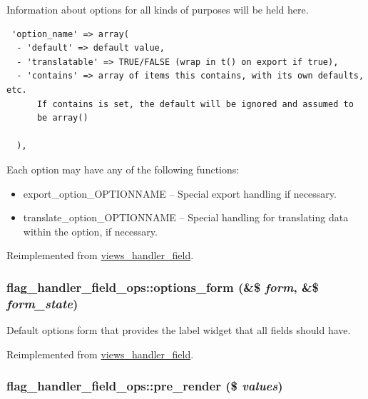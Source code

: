 Information about options for all kinds of purposes will be held here. 

\begin{Code}\begin{verbatim} 'option_name' => array(
  - 'default' => default value,
  - 'translatable' => TRUE/FALSE (wrap in t() on export if true),
  - 'contains' => array of items this contains, with its own defaults, etc.
      If contains is set, the default will be ignored and assumed to
      be array()

  ),
\end{verbatim}
\end{Code}

 Each option may have any of the following functions:\begin{itemize}
\item export\_\-option\_\-OPTIONNAME -- Special export handling if necessary.\item translate\_\-option\_\-OPTIONNAME -- Special handling for translating data within the option, if necessary. \end{itemize}


Reimplemented from \hyperlink{classviews__handler__field_64c69a8a3697603f8283405071c25b76}{views\_\-handler\_\-field}.\hypertarget{classflag__handler__field__ops_88b37806cdb2d420b830d0030ef7028a}{
\subsubsection[{options\_\-form}]{\setlength{\rightskip}{0pt plus 5cm}flag\_\-handler\_\-field\_\-ops::options\_\-form (\&\$ {\em form}, \/  \&\$ {\em form\_\-state})}}
\label{classflag__handler__field__ops_88b37806cdb2d420b830d0030ef7028a}


Default options form that provides the label widget that all fields should have. 

Reimplemented from \hyperlink{classviews__handler__field_0435d161922b7b4b84f02a2e79bb947a}{views\_\-handler\_\-field}.\hypertarget{classflag__handler__field__ops_5ad942714340d84d5462f3fd928a230c}{
\subsubsection[{pre\_\-render}]{\setlength{\rightskip}{0pt plus 5cm}flag\_\-handler\_\-field\_\-ops::pre\_\-render (\$ {\em values})}}
\label{classflag__handler__field__ops_5ad942714340d84d5462f3fd928a230c}


